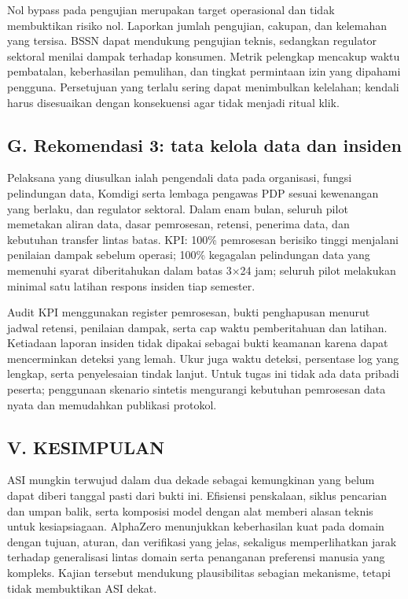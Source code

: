 \documentclass[conference,a4paper]{IEEEtran}
\begin{document}
Nol bypass pada pengujian merupakan target operasional dan tidak membuktikan risiko nol. Laporkan jumlah pengujian, cakupan, dan kelemahan yang tersisa. BSSN dapat mendukung pengujian teknis, sedangkan regulator sektoral menilai dampak terhadap konsumen. Metrik pelengkap mencakup waktu pembatalan, keberhasilan pemulihan, dan tingkat permintaan izin yang dipahami pengguna. Persetujuan yang terlalu sering dapat menimbulkan kelelahan; kendali harus disesuaikan dengan konsekuensi agar tidak menjadi ritual klik.

\subsection*{G. Rekomendasi 3: tata kelola data dan insiden}
Pelaksana yang diusulkan ialah pengendali data pada organisasi, fungsi pelindungan data, Komdigi serta lembaga pengawas PDP sesuai kewenangan yang berlaku, dan regulator sektoral. Dalam enam bulan, seluruh pilot memetakan aliran data, dasar pemrosesan, retensi, penerima data, dan kebutuhan transfer lintas batas. KPI: 100\% pemrosesan berisiko tinggi menjalani penilaian dampak sebelum operasi; 100\% kegagalan pelindungan data yang memenuhi syarat diberitahukan dalam batas 3$\times$24 jam; seluruh pilot melakukan minimal satu latihan respons insiden tiap semester.

Audit KPI menggunakan register pemrosesan, bukti penghapusan menurut jadwal retensi, penilaian dampak, serta cap waktu pemberitahuan dan latihan. Ketiadaan laporan insiden tidak dipakai sebagai bukti keamanan karena dapat mencerminkan deteksi yang lemah. Ukur juga waktu deteksi, persentase log yang lengkap, serta penyelesaian tindak lanjut. Untuk tugas ini tidak ada data pribadi peserta; penggunaan skenario sintetis mengurangi kebutuhan pemrosesan data nyata dan memudahkan publikasi protokol.

\subsection*{V. KESIMPULAN}
ASI mungkin terwujud dalam dua dekade sebagai kemungkinan yang belum dapat diberi tanggal pasti dari bukti ini. Efisiensi penskalaan, siklus pencarian dan umpan balik, serta komposisi model dengan alat memberi alasan teknis untuk kesiapsiagaan. AlphaZero menunjukkan keberhasilan kuat pada domain dengan tujuan, aturan, dan verifikasi yang jelas, sekaligus memperlihatkan jarak terhadap generalisasi lintas domain serta penanganan preferensi manusia yang kompleks. Kajian tersebut mendukung plausibilitas sebagian mekanisme, tetapi tidak membuktikan ASI dekat.
\end{document}
